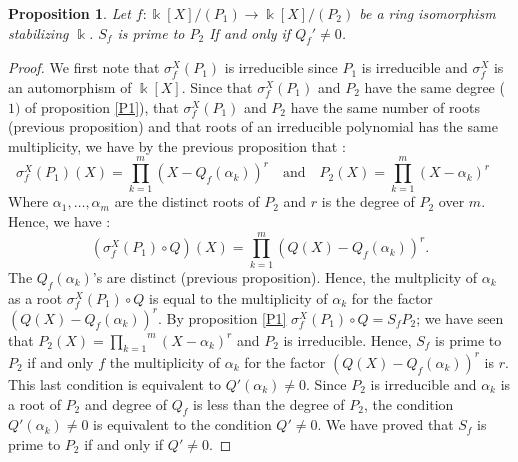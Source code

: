 \documentclass[12pt, reqno]{amsart}
\newtheorem{proposition}[theorem]{Proposition}
\newcommand{\K}{ {\Bbbk} }
\newcommand{\KP}{{\Bbbk[X]/(P_1)}}
\newcommand{\KPP}{{\Bbbk[X]/(P_2)}}
\begin{document}
\begin{proposition}
Let $f: \KP\to \KPP$ be a ring isomorphism stabilizing $\K$. $S_f$ is prime to $P_2$ If and only if $Q_f'\neq 0$.
\end{proposition}
\begin{proof}
We first note that $\sigma_f^X (P_1)$ is irreducible since $P_1$ is irreducible and $\sigma_f^X$ is an automorphism of $\K[X]$. Since that $\sigma_f^X (P_1)$ and $P_2$ have the same degree ( $1)$ of proposition \ref{P1}), that $\sigma_f^X (P_1)$ and $P_2$ have the same number of roots (previous proposition) and that roots of an irreducible polynomial has the same multiplicity, we have by the previous proposition that :
$$\sigma_f^X (P_1)(X)=\overset{m}{\underset{k=1}{\prod}}(X-Q_f(\alpha_k))^r \quad \text{and}\quad P_2(X)=\overset{m}{\underset{k=1}{\prod}}(X-\alpha_k)^r \quad $$
Where $\alpha_1,\dots,\alpha_m$ are the distinct roots of $P_2$ and $r$ is the degree of $P_2$ over $m$. Hence, we have : 
$$(\sigma_f^X (P_1)\circ Q)(X)=\overset{m}{\underset{k=1}{\prod}}(Q(X)-Q_f(\alpha_k))^r.$$ 
The $Q_f(\alpha_k)$'s are distinct (previous proposition). Hence, the multplicity of $\alpha_k$ as a root $\sigma_f^X (P_1)\circ Q$ is equal to the multiplicity of $\alpha_k$ for the factor $(Q(X)-Q_f(\alpha_k))^r$. By proposition \ref{P1}  $\sigma_f^X (P_1)\circ Q=S_fP_2$; we have seen that $ P_2(X)=\overset{m}{\underset{k=1}{\prod}}(X-\alpha_k)^r $ and $P_2$ is irreducible. Hence, $S_f$ is prime to $P_2$ if and 
only $f$ the multiplicity of $\alpha_k$ for the factor $(Q(X)-Q_f(\alpha_k))^r$ is $r$. This last condition is equivalent to $Q'(\alpha_k) \neq 0$. Since $P_2$ is irreducible and $\alpha_k$ is a root of $P_2$ and degree of $Q_f$ is less than the degree of $P_2$, the condition $Q'(\alpha_k) \neq 0$ is equivalent to the condition $Q'\neq 0$. We have proved that $S_f$ is prime to $P_2$ if and only if $Q' \neq 0$.
\end{proof}
\end{document}
